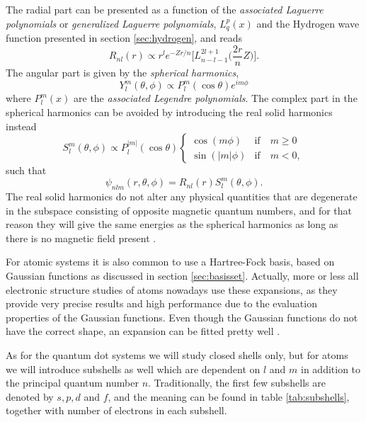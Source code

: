 The radial part can be presented as a function of the \textit{associated Laguerre polynomials} or \textit{generalized Laguerre polynomials}, $L_{q}^p(x)$ and the Hydrogen wave function presented in section \ref{sec:hydrogen}, and reads
\begin{equation}
R_{nl}(r)\propto r^le^{-Zr/n}\Big[L_{n-l-1}^{2l+1}\Big(\frac{2r}{n}Z\Big)\Big].
\end{equation}
The angular part is given by the \textit{spherical harmonics},
\begin{equation}
Y_l^m(\theta,\phi)\propto P_l^m(\cos\theta)e^{im\phi}
\end{equation}
where $P_l^m(x)$ are the \textit{associated Legendre polynomials}. The complex part in the spherical harmonics can be avoided by introducing the real solid harmonics instead
\begin{equation}
\label{eq:V_ext}
S_l^m(\theta,\phi)\propto P_l^{|m|}(\cos\theta)
\begin{cases} 
\cos(m\phi) & \text{if} \quad m\geq0 \\
\sin(|m|\phi) & \text{if} \quad m<0,
\end{cases}
\end{equation}
such that
\begin{equation}
\psi_{nlm}(r,\theta,\phi)= R_{nl}(r)S_l^m(\theta,\phi).
\label{eq:hydrogenlikesolid}
\end{equation}
The real solid harmonics do not alter any physical quantities that are degenerate in the subspace consisting of opposite magnetic quantum numbers, and for that reason they will give the same energies as the spherical harmonics as long as there is no magnetic field present \cite{morten_hjorth-jensen_computational_2019}.

For atomic systems it is also common to use a Hartree-Fock basis, based on Gaussian functions as discussed in section \ref{sec:basisset}. Actually, more or less all electronic structure studies of atoms nowadays use these expansions, as they provide very precise results and high performance due to the evaluation properties of the Gaussian functions. Even though the Gaussian functions do not have the correct shape, an expansion can be fitted pretty well \cite{hehre_selfconsistent_1969}.

As for the quantum dot systems we will study closed shells only, but for atoms we will introduce subshells as well which are dependent on $l$ and $m$ in addition to the principal quantum number $n$. Traditionally, the first few subshells are denoted by $s, p, d$ and $f$, and the meaning can be found in table \eqref{tab:subshells}, together with number of electrons in each subshell.

